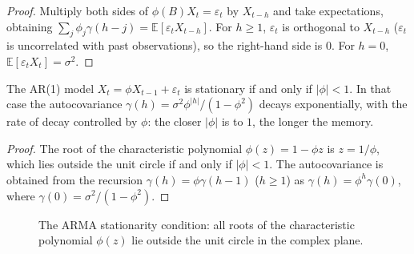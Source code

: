 \begin{proof}
Multiply both sides of $\phi(B)X_t=\varepsilon_t$ by $X_{t-h}$ and take expectations, obtaining $\sum_j\phi_j\gamma(h-j)=\mathbb{E}[\varepsilon_tX_{t-h}]$. For $h\ge1$, $\varepsilon_t$ is orthogonal to $X_{t-h}$ ($\varepsilon_t$ is uncorrelated with past observations), so the right-hand side is $0$. For $h=0$, $\mathbb{E}[\varepsilon_tX_t]=\sigma^2$.
\end{proof}

\begin{property}\label{prop:ts_stationarity_geometry}
The AR(1) model $X_t=\phi X_{t-1}+\varepsilon_t$ is stationary if and only if $|\phi|<1$. In that case the autocovariance $\gamma(h)=\sigma^2\phi^{|h|}/(1-\phi^2)$ decays exponentially, with the rate of decay controlled by $\phi$: the closer $|\phi|$ is to $1$, the longer the memory.
\end{property}

\begin{proof}
The root of the characteristic polynomial $\phi(z)=1-\phi z$ is $z=1/\phi$, which lies outside the unit circle if and only if $|\phi|<1$. The autocovariance is obtained from the recursion $\gamma(h)=\phi\gamma(h-1)$ ($h\ge1$) as $\gamma(h)=\phi^h\gamma(0)$, where $\gamma(0)=\sigma^2/(1-\phi^2)$.
\end{proof}

\begin{figure}[htbp]
\centering
{}
\caption{The ARMA stationarity condition: all roots of the characteristic polynomial $\phi(z)$ lie outside the unit circle in the complex plane.}
\label{fig:stationarity_condition}
\end{figure}


